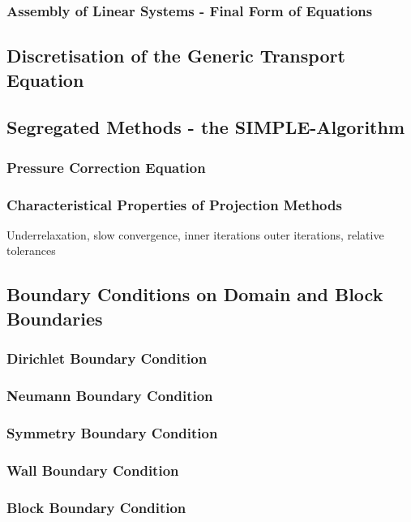 \documentclass[article,type=msc,colorback,accentcolor=tud2a]{tudthesis}
\begin{document}
      \subsubsection{Assembly of Linear Systems - Final Form of Equations}

    \subsection{Discretisation of the Generic Transport Equation}

    \subsection{Segregated Methods - the SIMPLE-Algorithm}
      
      \subsubsection{Pressure Correction Equation}
      \subsubsection{Characteristical Properties of Projection Methods}

        Underrelaxation, slow convergence, inner iterations outer iterations, relative tolerances

    \subsection{Boundary Conditions on Domain and Block Boundaries}
      
      \subsubsection{Dirichlet Boundary Condition}
      \subsubsection{Neumann Boundary Condition}
      \subsubsection{Symmetry Boundary Condition}
      \subsubsection{Wall Boundary Condition}
      \subsubsection{Block Boundary Condition}
      
\end{document}
